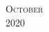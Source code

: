 \documentclass[10pt]{article} %
\begin{document}
\pagestyle{empty} %

\setlength{\parindent}{0pt} %



\begin{center}
	\textsc{\LARGE October}\\ %
	\textsc{\large 2020} %
\end{center}

\end{document}
